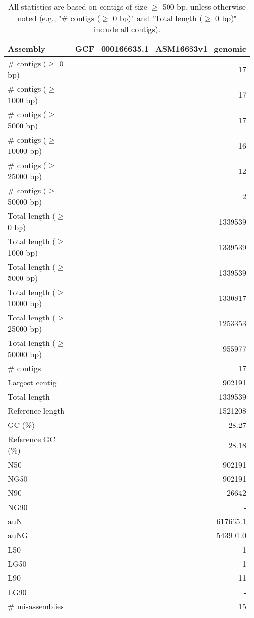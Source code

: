 \documentclass[12pt,a4paper]{article}
\begin{document}
\begin{table}[ht]
\begin{center}
\caption{All statistics are based on contigs of size $\geq$ 500 bp, unless otherwise noted (e.g., "\# contigs ($\geq$ 0 bp)" and "Total length ($\geq$ 0 bp)" include all contigs).}
\begin{tabular}{|l*{1}{|r}|}
\hline
Assembly & GCF\_000166635.1\_ASM16663v1\_genomic \\ \hline
\# contigs ($\geq$ 0 bp) & 17 \\ \hline
\# contigs ($\geq$ 1000 bp) & 17 \\ \hline
\# contigs ($\geq$ 5000 bp) & 17 \\ \hline
\# contigs ($\geq$ 10000 bp) & 16 \\ \hline
\# contigs ($\geq$ 25000 bp) & 12 \\ \hline
\# contigs ($\geq$ 50000 bp) & 2 \\ \hline
Total length ($\geq$ 0 bp) & 1339539 \\ \hline
Total length ($\geq$ 1000 bp) & 1339539 \\ \hline
Total length ($\geq$ 5000 bp) & 1339539 \\ \hline
Total length ($\geq$ 10000 bp) & 1330817 \\ \hline
Total length ($\geq$ 25000 bp) & 1253353 \\ \hline
Total length ($\geq$ 50000 bp) & 955977 \\ \hline
\# contigs & 17 \\ \hline
Largest contig & 902191 \\ \hline
Total length & 1339539 \\ \hline
Reference length & 1521208 \\ \hline
GC (\%) & 28.27 \\ \hline
Reference GC (\%) & 28.18 \\ \hline
N50 & 902191 \\ \hline
NG50 & 902191 \\ \hline
N90 & 26642 \\ \hline
NG90 & - \\ \hline
auN & 617665.1 \\ \hline
auNG & 543901.0 \\ \hline
L50 & 1 \\ \hline
LG50 & 1 \\ \hline
L90 & 11 \\ \hline
LG90 & - \\ \hline
\# misassemblies & 15 \\ \hline

\end{tabular}
\end{center}
\end{table}
\end{document}
